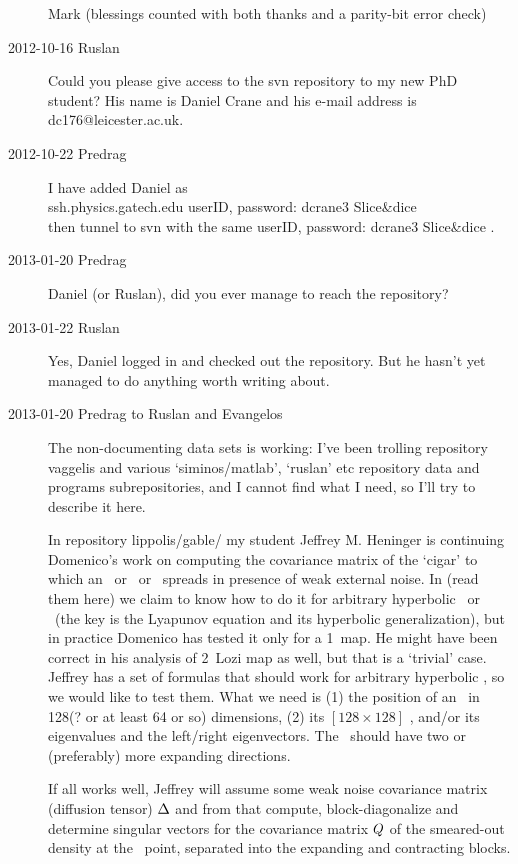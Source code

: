 \begin{description}
Mark (blessings counted with both thanks and a parity-bit error check)


\item[2012-10-16 Ruslan] Could you please give access to the svn
repository to my new PhD student?  His name is Daniel Crane and his
e-mail address is dc176@leicester.ac.uk.

\item[2012-10-22 Predrag] I have added Daniel as
\\
ssh.physics.gatech.edu userID, password: dcrane3 	Slice{\&}dice
\\
then
{tunnel to svn} with the same userID,   password:
dcrane3           Slice{\&}dice .

\item[2013-01-20 Predrag] Daniel (or Ruslan), did you ever manage to reach the repository?
\item[2013-01-22 Ruslan] Yes, Daniel logged in and checked out the repository.  But he hasn't yet managed to do anything worth writing about.

\item[2013-01-20  Predrag
to Ruslan and Evangelos]
The non-documenting data sets is working: I've been trolling
repository vaggelis and various `siminos/matlab', `ruslan' etc
repository data and programs subrepositories, and I cannot find what
I need, so I'll try to describe it here.

In repository lippolis/gable/ my student Jeffrey M. Heninger is
continuing Do\-me\-ni\-co's work on computing the covariance matrix of the
`cigar' to which an \eqv\ or \po\ or \rpo\ spreads in presence of
weak external noise. In  (read them
{here}) we claim to know how to do it for arbitrary hyperbolic \eqv\
or \po\ (the key is the Lyapunov equation and its hyperbolic
generalization), but in practice Domenico has tested it only for a
1\dmn\ map. He might have been correct in his analysis of 2\dmn\ Lozi
map as well, but that is a `trivial' case. Jeffrey has a set of
formulas that should work for arbitrary hyperbolic \eqv, so we would
like to test them. What we need is (1) the position of an \eqv\ in
128(? or at least 64 or so) dimensions, (2) its $[128\!\times\!128]$
{\stabmat} {\Mvar}, and/or its eigenvalues and the left/right
eigenvectors. The \eqv\ should have two or (preferably) more
expanding directions.

If all works well, Jeffrey will assume some weak noise covariance
matrix (diffusion tensor) $\Delta$ and from that compute,
block-diagonalize and determine singular vectors for the covariance matrix
$Q$ of the smeared-out density at the \eqv\ point, separated
into the expanding and contracting blocks.


\end{description}

